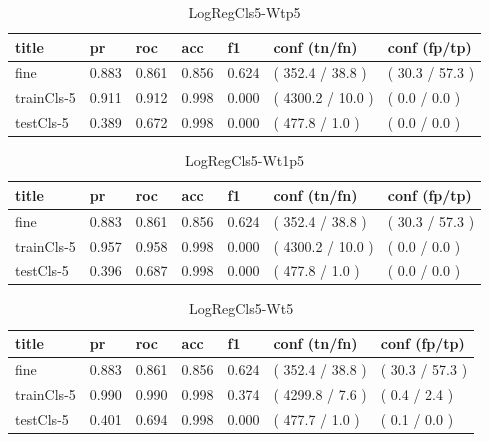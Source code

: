 \documentclass[ms]{nuthesis}
\begin{document}
\FloatBarrier
\begin{table}[H]
\centering
\begin{tabular}{|l||l||l||l||l||l||l|}\toprule
title & pr & roc & acc & f1 & conf (tn/fn) & conf (fp/tp) \\ \midrule
fine & 0.883 & 0.861 & 0.856 & 0.624 & ( 352.4 / 38.8 ) & ( 30.3 / 57.3 ) \\
trainCls-5 & 0.911 & 0.912 & 0.998 & 0.000 & ( 4300.2 / 10.0 ) & ( 0.0 / 0.0 ) \\
testCls-5 & 0.389 & 0.672 & 0.998 & 0.000 & ( 477.8 / 1.0 ) & ( 0.0 / 0.0 ) \\ \bottomrule
\end{tabular}
\caption{LogRegCls5-Wtp5}
\label{tab:LogRegCls5-Wtp5}
\end{table}
\FloatBarrier


\FloatBarrier
\begin{table}[H]
\centering
\begin{tabular}{|l||l||l||l||l||l||l|}\toprule
title & pr & roc & acc & f1 & conf (tn/fn) & conf (fp/tp) \\ \midrule
fine & 0.883 & 0.861 & 0.856 & 0.624 & ( 352.4 / 38.8 ) & ( 30.3 / 57.3 ) \\
trainCls-5 & 0.957 & 0.958 & 0.998 & 0.000 & ( 4300.2 / 10.0 ) & ( 0.0 / 0.0 ) \\
testCls-5 & 0.396 & 0.687 & 0.998 & 0.000 & ( 477.8 / 1.0 ) & ( 0.0 / 0.0 ) \\ \bottomrule
\end{tabular}
\caption{LogRegCls5-Wt1p5}
\label{tab:LogRegCls5-Wt1p5}
\end{table}
\FloatBarrier

\FloatBarrier
\begin{table}[H]
\centering
\begin{tabular}{|l||l||l||l||l||l||l|}\toprule
title & pr & roc & acc & f1 & conf (tn/fn) & conf (fp/tp) \\ \midrule
fine & 0.883 & 0.861 & 0.856 & 0.624 & ( 352.4 / 38.8 ) & ( 30.3 / 57.3 ) \\
trainCls-5 & 0.990 & 0.990 & 0.998 & 0.374 & ( 4299.8 / 7.6 ) & ( 0.4 / 2.4 ) \\
testCls-5 & 0.401 & 0.694 & 0.998 & 0.000 & ( 477.7 / 1.0 ) & ( 0.1 / 0.0 ) \\ \bottomrule
\end{tabular}
\caption{LogRegCls5-Wt5}
\label{tab:LogRegCls5-Wt5}
\end{table}
\FloatBarrier
\end{document}
